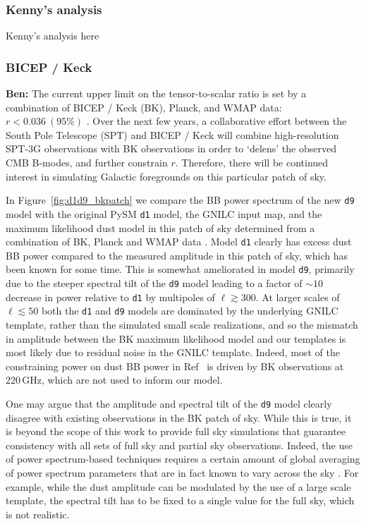 \documentclass[twocolumn]{aastex631}
\newcommand{\done}{{\tt d1}}
\newcommand{\dnine}{{\tt d9}}
\begin{document}
\subsubsection{Kenny's analysis} 
Kenny's analysis here

\subsubsection{BICEP / Keck} \label{sec:bkspt_spectra}

\textbf{Ben:} The current upper limit on the tensor-to-scalar ratio is set by a combination of BICEP / Keck (BK), Planck, and WMAP data: $r < 0.036~(95\%)$ \citep{Ade:2021}. Over the next few years, a collaborative effort between the South Pole Telescope (SPT) and BICEP / Keck will combine high-resolution SPT-3G observations with BK observations in order to `delens' the observed CMB B-modes, and further constrain $r$. Therefore, there will be continued interest in simulating Galactic foregrounds on this particular patch of sky. 

In Figure~\ref{fig:d1d9_bkpatch} we compare the BB power spectrum of the new \dnine{} model with the original PySM \done{} model, the GNILC input map, and the maximum likelihood dust model in this patch of sky determined from a combination of BK, Planck and WMAP data \citep{Ade:2021}. Model \done{} clearly has excess dust BB power compared to the measured amplitude in this patch of sky, which has been known for some time. This is somewhat ameliorated in model \dnine{}, primarily due to the steeper spectral tilt of the \dnine{} model leading to a factor of $\sim 10$ decrease in power relative to \done{} by multipoles of $\ell \gtrsim 300$. At larger scales of $\ell \lesssim 50$ both the \done{} and \dnine{} models are dominated by the underlying GNILC template, rather than the simulated small scale realizations, and so the mismatch in amplitude between the BK maximum likelihood model and our templates is most likely due to residual noise in the GNILC template. Indeed, most of the constraining power on dust BB power in Ref~\cite{Ade:2021} is driven by BK observations at 220\,GHz, which are not used to inform our model. 

One may argue that the amplitude and spectral tilt of the \dnine{} model clearly disagree with existing observations in the BK patch of sky. While this is true, it is beyond the scope of this work to provide full sky simulations that guarantee consistency with all sets of full sky and partial sky observations. Indeed, the use of power spectrum-based techniques requires a certain amount of global averaging of power spectrum parameters that are in fact known to vary across the sky \cite{planck2016-l04}. For example, while the dust amplitude can be modulated by the use of a large scale template, the spectral tilt has to be fixed to a single value for the full sky, which is not realistic. 
\end{document}
